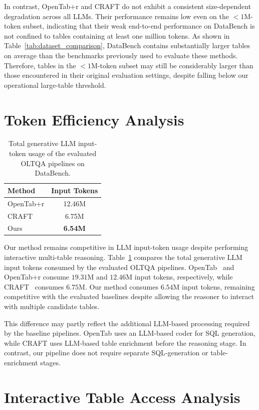 In contrast, OpenTab+r and CRAFT do not exhibit a consistent size-dependent degradation across all LLMs.
Their performance remains low even on the $<1$M-token subset, indicating that their weak end-to-end performance on DataBench is not confined to tables containing at least one million tokens.
As shown in Table~\ref{tab:dataset_comparison}, DataBench contains substantially larger tables on average than the benchmarks previously used to evaluate these methods.
Therefore, tables in the $<1$M-token subset may still be considerably larger than those encountered in their original evaluation settings, despite falling below our operational large-table threshold.


\section{Token Efficiency Analysis}
\begin{table}[t]
\centering
\small
\begin{tabular}{lc}
\hline
\textbf{Method} & \textbf{Input Tokens} \\
\hline
OpenTab+r & 12.46M \\
CRAFT     & 6.75M \\
\hline
Ours      & \textbf{6.54M} \\
\hline
\end{tabular}
\caption{Total generative LLM input-token usage of the evaluated OLTQA pipelines on DataBench.}
\label{tab:token_efficiency}
\end{table}

Our method remains competitive in LLM input-token usage despite performing interactive multi-table reasoning.
Table~\ref{tab:token_efficiency} compares the total generative LLM input tokens consumed by the evaluated OLTQA pipelines.
OpenTab~\cite{opentab} and OpenTab+r consume $19.31$M and $12.46$M input tokens, respectively, while CRAFT~\cite{craft} consumes $6.75$M.
Our method consumes $6.54$M input tokens, remaining competitive with the evaluated baselines despite allowing the reasoner to interact with multiple candidate tables.

This difference may partly reflect the additional LLM-based processing required by the baseline pipelines.
OpenTab uses an LLM-based coder for SQL generation, while CRAFT uses LLM-based table enrichment before the reasoning stage.
In contrast, our pipeline does not require separate SQL-generation or table-enrichment stages.


\section{Interactive Table Access Analysis}

